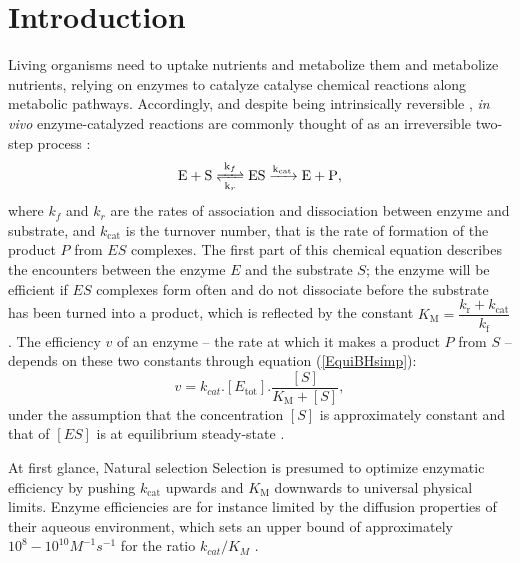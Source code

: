 \documentclass[11pt,onecolumn]{article}
\providecommand{\DIFadd}[1]{{\protect\color{blue} \sf #1}} %
\providecommand{\DIFdel}[1]{{\protect\color{red} \scriptsize #1}} %
\providecommand{\DIFaddbegin}{} %
\providecommand{\DIFaddend}{} %
\providecommand{\DIFdelbegin}{} %
\providecommand{\DIFdelend}{} %
\begin{document}
\section{{Introduction}\label{sec:Intro}}

Living organisms need to uptake \DIFdelbegin \DIFdel{nutrients and metabolize them}\DIFdelend \DIFaddbegin \DIFadd{and metabolize nutrients}\DIFaddend , relying on enzymes to \DIFdelbegin \DIFdel{catalyze }\DIFdelend \DIFaddbegin \DIFadd{catalyse }\DIFaddend chemical reactions along metabolic pathways. Accordingly, and despite being intrinsically reversible \citep{Haldane30,Klipp94}, \textit{in vivo} enzyme-catalyzed reactions are commonly thought of as an irreversible two-step process \citep{Bar-Even11,Bar-Even15,MichaelisMenten1913,Johnson11}:
\begin{equation}
\ce{ E + S <=>[k_{f}][k_{r}] ES ->[k_{cat}] E + P },
\label{chemMM}
\end{equation}
where $k_f$ and $k_r$ are the rates of association and dissociation between enzyme and substrate, and $k_\text{cat}$ is the turnover number, that is the rate of formation of the product $P$ from $ES$ complexes. The first part of this chemical equation describes the encounters between the enzyme $E$ and the substrate $S$; the enzyme will be efficient if $ES$ complexes form often and do not dissociate before the substrate has been turned into a product, which is reflected by the constant $K_\text{M}=\dfrac{k_\text{r}+k_\text{cat}}{k_\text{f}}$. The efficiency $v$ of an enzyme -- the rate at which it makes a product $P$ from $S$ -- depends on these two constants through equation (\ref{EquiBHsimp}):
\begin{equation}
v=k_{cat}.[E_\text{tot}].\frac{[S]}{K_\text{M}+[S]},
\label{EquiBHsimp}
\end{equation}
\noindent under the assumption that the concentration $[S]$ is approximately constant and that of $[ES]$ is at \DIFdelbegin \DIFdel{equilibrium }\DIFdelend \DIFaddbegin \DIFadd{steady-state }\DIFaddend \citep{MichaelisMenten1913, Briggs25}.

At first glance, Natural \DIFdelbegin \DIFdel{selection }\DIFdelend \DIFaddbegin \DIFadd{Selection }\DIFaddend is presumed to optimize enzymatic efficiency by pushing $k_\text{cat}$ upwards and $K_\text{M}$ downwards to universal physical limits. Enzyme efficiencies are for instance limited by the diffusion properties of their aqueous environment, which sets an upper bound of approximately $10^8-10^{10} M^{-1}s^{-1}$ for the ratio \DIFdelbegin \DIFdel{${k_{cat}}/{K_M}$  \citep{Alberty58,Zhou82}. }%
\end{document}
